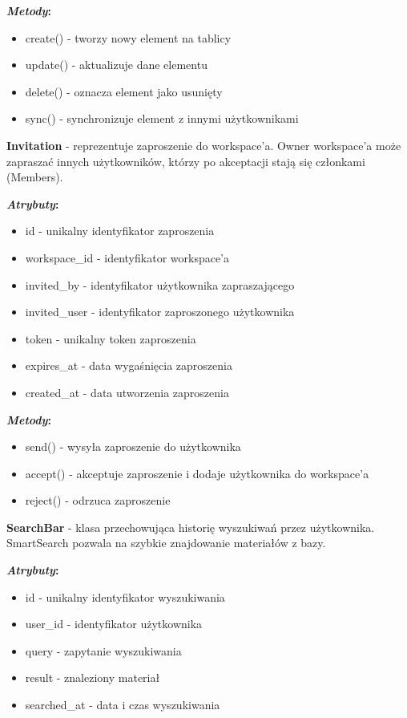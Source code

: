\documentclass[12pt,a4paper]{article}
\begin{document}
\textbf{\textit{Metody}:}
\begin{itemize}[leftmargin=*]
    \item create() - tworzy nowy element na tablicy
    \item update() - aktualizuje dane elementu
    \item delete() - oznacza element jako usunięty
    \item sync() - synchronizuje element z innymi użytkownikami
\end{itemize}

\vspace{1em}

\textbf{Invitation} - reprezentuje zaproszenie do workspace'a. Owner workspace'a może zapraszać innych użytkowników, którzy po akceptacji stają się członkami (Members).

\textbf{\textit{Atrybuty}:}
\begin{itemize}[leftmargin=*]
    \item id - unikalny identyfikator zaproszenia
    \item workspace\_id - identyfikator workspace'a
    \item invited\_by - identyfikator użytkownika zapraszającego
    \item invited\_user - identyfikator zaproszonego użytkownika
    \item token - unikalny token zaproszenia
    \item expires\_at - data wygaśnięcia zaproszenia
    \item created\_at - data utworzenia zaproszenia
\end{itemize}

\textbf{\textit{Metody}:}
\begin{itemize}[leftmargin=*]
    \item send() - wysyła zaproszenie do użytkownika
    \item accept() - akceptuje zaproszenie i dodaje użytkownika do workspace'a
    \item reject() - odrzuca zaproszenie
\end{itemize}

\vspace{1em}

\textbf{SearchBar} - klasa przechowująca historię wyszukiwań przez użytkownika. SmartSearch pozwala na szybkie znajdowanie materiałów z bazy.

\textbf{\textit{Atrybuty}:}
\begin{itemize}[leftmargin=*]
    \item id - unikalny identyfikator wyszukiwania
    \item user\_id - identyfikator użytkownika
    \item query - zapytanie wyszukiwania
    \item result - znaleziony materiał
    \item searched\_at - data i czas wyszukiwania
\end{itemize}
\end{document}
